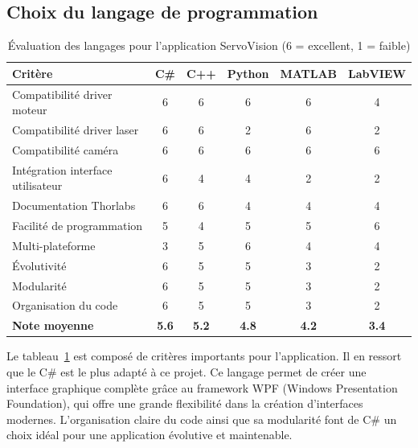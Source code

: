 \subsection{Choix du langage de programmation}
\begin{table}[H]
    \centering
    \begin{tabular}{|l|c|c|c|c|c|}
        \hline
        \textbf{Critère}                  & \textbf{C\#} & \textbf{C++} & \textbf{Python} & \textbf{MATLAB} & \textbf{LabVIEW} \\
        \hline
        Compatibilité driver moteur       & 6            & 6            & 6               & 6               & 4                \\
        Compatibilité driver laser        & 6            & 6            & 2               & 6               & 2                \\
        Compatibilité caméra              & 6            & 6            & 6               & 6               & 6                \\
        Intégration interface utilisateur & 6            & 4            & 4               & 2               & 2                \\
        Documentation Thorlabs            & 6            & 6            & 4               & 4               & 4                \\
        Facilité de programmation         & 5            & 4            & 5               & 5               & 6                \\
        Multi-plateforme                  & 3            & 5            & 6               & 4               & 4                \\
        Évolutivité                       & 6            & 5            & 5               & 3               & 2                \\
        Modularité                        & 6            & 5            & 5               & 3               & 2                \\
        Organisation du code              & 6            & 5            & 5               & 3               & 2                \\
        \hline
        \textbf{Note moyenne}             & \textbf{5.6} & \textbf{5.2} & \textbf{4.8}    & \textbf{4.2}    & \textbf{3.4}     \\
        \hline
    \end{tabular}
    \caption{Évaluation des langages pour l'application ServoVision (6 = excellent, 1 = faible)}
    \label{tab:langages}
\end{table}
Le tableau~\ref{tab:langages} est composé de critères importants pour l'application. Il en ressort que le C\# est le plus adapté à ce projet. Ce langage permet de créer une interface graphique complète grâce au framework WPF (Windows Presentation Foundation), qui offre une grande flexibilité dans la création d'interfaces modernes. L'organisation claire du code ainsi que sa modularité font de C\# un choix idéal pour une application évolutive et maintenable.

